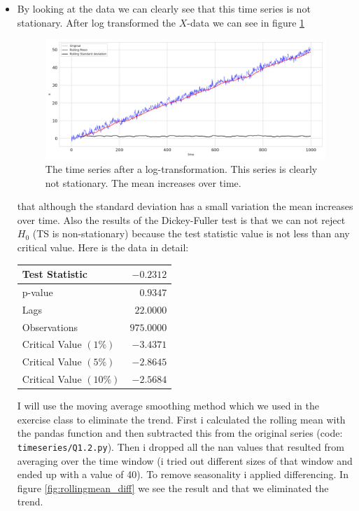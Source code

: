 \documentclass[]{article}
\begin{document}
	\begin{itemize}
		\item By looking at the data we can clearly see that this time series is not stationary. After log transformed the $X$-data we can see in figure \ref{fig:rollingmean} 
		\begin{figure}
			\centering
			\includegraphics[width=1\textwidth]{images/ts_log.png}
			\caption{The time series after a log-transformation. This series is clearly not stationary. The mean increases over time.}
			\label{fig:rollingmean}
		\end{figure}
		that although the standard deviation has a small variation the mean increases over time. Also the results of the Dickey-Fuller test is that we can not reject $H_0$ (TS is non-stationary) because the test statistic value is not less than any critical value. Here is the data in detail: 
		\begin{center}
			\begin{tabular}{|l|r|}
				\hline Test Statistic & $-0.2312$ \\
				\hline p-value & $0.9347$ \\
				\hline Lags & $22.0000$ \\
				\hline Observations & $975.0000$ \\
				\hline Critical Value $(1 \%)$ & $-3.4371$ \\
				\hline Critical Value $(5 \%)$ & $-2.8645$ \\
				\hline Critical Value $(10 \%)$ & $-2.5684$ \\
				\hline
			\end{tabular}
			\label{tab:dickey}
		\end{center}
		I will use the moving average smoothing method which we used in the exercise class to eliminate the trend. First i calculated the rolling mean with the pandas function and then subtracted this from the original series (code: \texttt{timeseries/Q1.2.py}). Then i dropped all the nan values that resulted from averaging over the time window (i tried out different sizes of that window and ended up with a value of 40). To remove seasonality i applied differencing. In figure \ref{fig:rollingmean_diff} we see the result and that we eliminated the trend.

\end{itemize}
\end{document}
